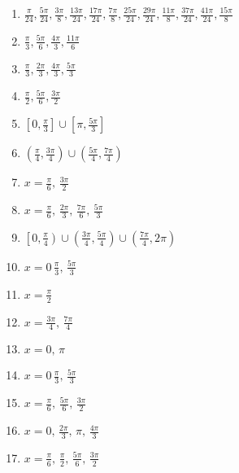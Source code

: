 \begin{enumerate}
	\item $\frac{\pi}{24}, \frac{5\pi}{24}, \frac{3\pi}{8}, \frac{13\pi}{24}, \frac{17\pi}{24}, \frac{7\pi}{8}, \frac{25\pi}{24}, \frac{29\pi}{24}, \frac{11\pi}{8}, \frac{37\pi}{24}, \frac{41\pi}{24}, \frac{15\pi}{8}$
    
	\item $\frac{\pi}{3}, \frac{5\pi}{6}, \frac{4\pi}{3}, \frac{11\pi}{6}$
    
	\item $\frac{\pi}{3}, \frac{2\pi}{3}, \frac{4\pi}{3}, \frac{5\pi}{3}$
    
	\item $\frac{\pi}{2}, \frac{5\pi}{6}, \frac{3\pi}{2}$
    
	\item $\left[0, \frac{\pi}{3}\right] \cup \left[\pi, \frac{5\pi}{3}\right]$
    
	\item $\left(\frac{\pi}{4}, \frac{3\pi}{4}\right) \cup \left(\frac{5\pi}{4}, \frac{7\pi}{4}\right)$
	
	\item $x = \frac{\pi}{6}, \, \frac{3\pi}{2}$
	
	\item $x = \frac{\pi}{6}, \, \frac{2\pi}{3}, \, \frac{7\pi}{6}, \, \frac{5\pi}{3}$
	
    \item $\left[0, \frac{\pi}{4}\right) \cup \left(\frac{3\pi}{4}, \frac{5\pi}{4}\right) \cup \left(\frac{7\pi}{4}, 2\pi\right)$
    
    \item $x = 0 \, \frac{\pi}{3}, \, \frac{5\pi}{3}$
    
    \item $x = \frac{\pi}{2}$
    
    \item $x = \frac{3\pi}{4}, \, \frac{7\pi}{4}$
    \item $x = 0, \, \pi$
    \item $x = 0 \, \frac{\pi}{3}, \, \frac{5\pi}{3}$
    \item $x = \frac{\pi}{6}, \, \frac{5\pi}{6}, \, \frac{3\pi}{2}$
    \item $x = 0, \, \frac{2\pi}{3}, \, \pi, \, \frac{4\pi}{3}$
    \item $x = \frac{\pi}{6}, \, \frac{\pi}{2}, \, \frac{5\pi}{6}, \, \frac{3\pi}{2}$
\end{enumerate}